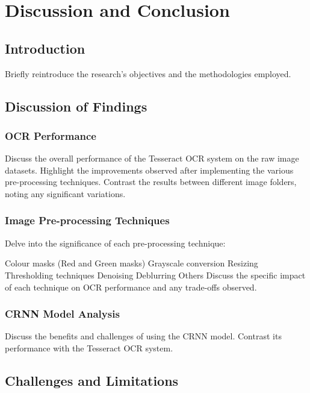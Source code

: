 \chapter{Discussion and Conclusion}
\label{chap:conclusion}

\section{Introduction}

Briefly reintroduce the research's objectives and the methodologies employed.





\section{Discussion of Findings}
\subsection{OCR Performance}

Discuss the overall performance of the Tesseract OCR system on the raw image datasets.
Highlight the improvements observed after implementing the various pre-processing techniques.
Contrast the results between different image folders, noting any significant variations.

\subsection{Image Pre-processing Techniques}

Delve into the significance of each pre-processing technique:



Colour masks (Red and Green masks)
Grayscale conversion
Resizing
Thresholding techniques
Denoising
Deblurring
Others
Discuss the specific impact of each technique on OCR performance and any trade-offs observed.

\subsection{CRNN Model Analysis}

Discuss the benefits and challenges of using the CRNN model.
Contrast its performance with the Tesseract OCR system.

\section{Challenges and Limitations}

